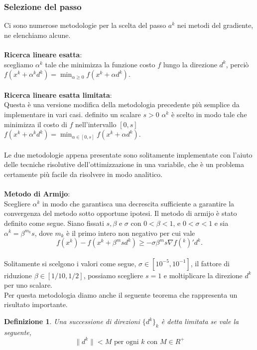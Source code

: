 \documentclass[a4paper, 12pt]{article}
\newtheorem{definition}{Definizione}
\begin{document}
\subsubsection{Selezione del passo}
Ci sono numerose metodologie per la scelta del passo $a^k$ nei metodi del gradiente, ne elenchiamo alcune.\\\\
\textbf{Ricerca lineare esatta}:\\
scegliamo $\alpha^k$ tale che minimizza la funzione costo $f$ lungo la direzione $d^k$, perciò\\
$f(x^k + \alpha^k d^k) = \min_{\alpha \geq 0} f(x^k + \alpha d^k)$.\\\\
\textbf{Ricerca lineare esatta limitata}:\\
Questa è una versione modifica della metodologia precedente più semplice da implementare in vari casi. definito un scalare $s > 0$ $\alpha^k$ è scelto in modo tale che minimizza il costo di $f$ nell'intervallo $[0, s]$\\
$f(x^k + \alpha^k d^k) = \min_{\alpha \in [0, s]} f(x^k + \alpha d^k)$.\\\\
Le due metodologie appena presentate sono solitamente implementate con l'aiuto delle tecniche risolutive dell'ottimizzazione in una variabile, che è un problema certamente più facile da risolvere in modo analitico.\\\\
\textbf{Metodo di Armijo}:\\
Scegliere $\alpha^k$ in modo che garantisca una decrescita sufficiente a garantire la convergenza del metodo sotto opportune ipotesi. Il metodo di armijo è stato definito come segue. Siano fissati $s, \beta$ e $\sigma$ con $0 < \beta < 1$, e $0 < \sigma < 1$ e sia $\alpha^k = \beta^{m_k} s$, dove $m_k$ è il primo intero non negativo per cui vale\\
\[f(x^k) - f(x^k + \beta^m s d^k) \geq -\sigma \beta^m s \nabla f(^k)'d^k.\]\\
Solitamente si scelgono i valori come segue, $\sigma \in [10^{-5}, 10^{-1}]$, il fattore di riduzione $\beta \in [1/10, 1/2]$, possiamo scegliere $s = 1$ e moltiplicare la direzione $d^k$ per uno scalare.\\
Per questa metodologia diamo anche il seguente teorema che rappresenta un risultato importante.
\begin{definition}
Una successione di direzioni $\{d^k\}_k$ è detta limitata se vale la seguente,\\ \[\parallel d^k \parallel < M \mbox{ per ogni } k \mbox{ con } M \in R^+\]\\
\end{definition}
\end{document}
